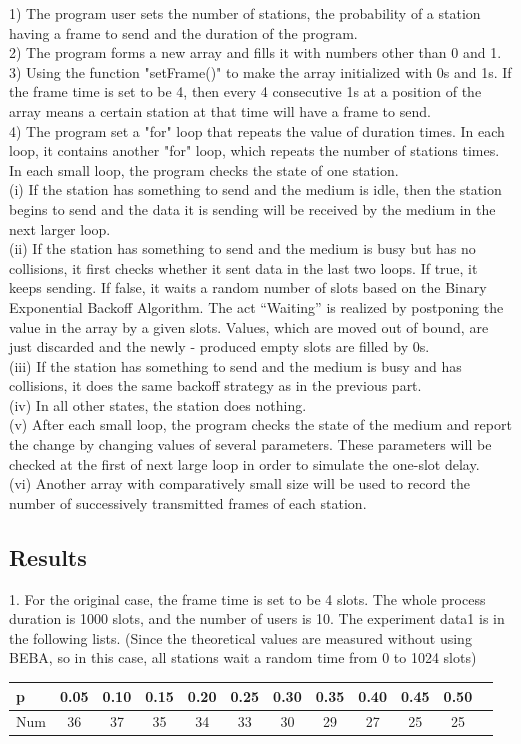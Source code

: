 \documentclass[11pt,a4paper]{report}
\begin{document}
1) The program user sets the number of stations, the probability of a station having a frame to send and the duration of the program. \\
2) The program forms a new array and fills it with numbers other than 0 and 1. \\
3) Using the function "setFrame()" to make the array initialized with 0s and 1s. If the frame time is set to be 4, then every 4 consecutive 1s at a position of the array means a certain station at that time will have a frame to send. \\
4) The program set a "for" loop that repeats the value of duration times. In each loop, it contains another "for" loop, which repeats the number of stations times. In each small loop, the program checks the state of one station. \\
(i) If the station has something to send and the medium is idle, then the station begins to send and the data it is sending will be received by the medium in the next larger loop. \\
(ii) If the station has something to send and the medium is busy but has no collisions, it first checks whether it sent data in the last two loops. If true, it keeps sending. If false, it waits a random number of slots based on the Binary Exponential Backoff Algorithm. The act “Waiting” is realized by postponing the value in the array by a given slots. Values, which are moved out of bound, are just discarded and the newly - produced empty slots are filled by 0s. \\
(iii) If the station has something to send and the medium is busy and has collisions, it does the same backoff strategy as in the previous part. \\
(iv) In all other states, the station does nothing. \\
(v) After each small loop, the program checks the state of the medium and report the change by changing values of several parameters. These parameters will be checked at the first of next large loop in order to simulate the one-slot delay. \\
(vi) Another array with comparatively small size will be used to record the number of successively transmitted frames of each station.

\subsection*{Results}
1. For the original case, the frame time is set to be 4 slots. The whole process duration is 1000 slots, and the number of users is 10. The experiment data1 is in the following lists. (Since the theoretical values are measured without using BEBA, so in this case, all stations wait a random time from 0 to 1024 slots) \\
\begin{table}[htbp]
\begin{tabular}{lccccccccccc}
\toprule
p & 0.05 & 0.10 & 0.15  & 0.20 & 0.25 & 0.30 & 0.35 & 0.40 & 0.45 & 0.50 \\
\midrule
Num & 36 & 37 & 35 & 34 & 33 & 30 & 29 & 27 & 25 & 25 \\
\bottomrule
\end{tabular}
\end{table}
\end{document}
